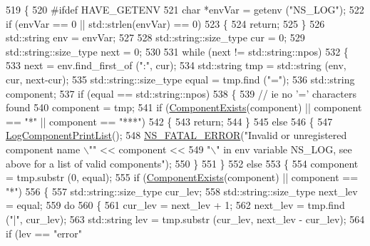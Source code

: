 \begin{DoxyCode}
519 \{
520 \textcolor{preprocessor}{#ifdef HAVE\_GETENV}
521   \textcolor{keywordtype}{char} *envVar = getenv (\textcolor{stringliteral}{"NS\_LOG"});
522   \textcolor{keywordflow}{if} (envVar == 0 || std::strlen(envVar) == 0)
523     \{
524       \textcolor{keywordflow}{return};
525     \}
526   std::string env = envVar;
527 
528   std::string::size\_type cur = 0;
529   std::string::size\_type next = 0;
530   
531   \textcolor{keywordflow}{while} (next != std::string::npos)
532     \{
533       next = env.find\_first\_of (\textcolor{stringliteral}{":"}, cur);
534       std::string tmp = std::string (env, cur, next-cur);
535       std::string::size\_type equal = tmp.find (\textcolor{stringliteral}{"="});
536       std::string component;
537       \textcolor{keywordflow}{if} (equal == std::string::npos)
538         \{
539           \textcolor{comment}{// ie no '=' characters found }
540           component = tmp;
541           \textcolor{keywordflow}{if} (\hyperlink{group__logging_gaadcc698770aae684c54dbd1ef4e4b37a}{ComponentExists}(component) || component == \textcolor{stringliteral}{"*"} || component == \textcolor{stringliteral}{"***"})
542             \{
543               \textcolor{keywordflow}{return};
544             \}
545           \textcolor{keywordflow}{else} 
546             \{
547               \hyperlink{namespacens3_a5252703c3f8260fd6dc609f1b276e57c}{LogComponentPrintList}();
548               \hyperlink{group__fatal_ga5131d5e3f75d7d4cbfd706ac456fdc85}{NS\_FATAL\_ERROR}(\textcolor{stringliteral}{"Invalid or unregistered component name \(\backslash\)""} << component <<
549                              \textcolor{stringliteral}{"\(\backslash\)" in env variable NS\_LOG, see above for a list of valid components"});
550             \}
551         \}
552       \textcolor{keywordflow}{else}
553         \{
554           component = tmp.substr (0, equal);
555           \textcolor{keywordflow}{if} (\hyperlink{group__logging_gaadcc698770aae684c54dbd1ef4e4b37a}{ComponentExists}(component) || component == \textcolor{stringliteral}{"*"})
556             \{
557               std::string::size\_type cur\_lev;
558               std::string::size\_type next\_lev = equal;
559               \textcolor{keywordflow}{do}
560                 \{
561                   cur\_lev = next\_lev + 1;
562                   next\_lev = tmp.find (\textcolor{stringliteral}{"|"}, cur\_lev);
563                   std::string lev = tmp.substr (cur\_lev, next\_lev - cur\_lev);
564                   \textcolor{keywordflow}{if} (lev == \textcolor{stringliteral}{"error"}

\end{DoxyCode}
